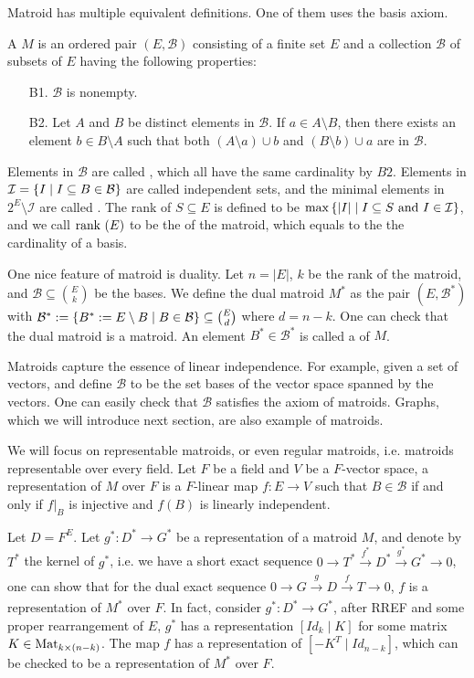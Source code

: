 \documentclass[b5paper]{article}
\newcommand{\II}{\mathcal{I}}
\newcommand{\BB}{\mathcal{B}}
\newcommand{\del}{\setminus}
\begin{document}
Matroid has multiple equivalent definitions. One of them uses the basis axiom. 
\begin{definition}[def:]{}
  A  $M$ is an ordered pair $(E,\BB)$ consisting of a finite set $E$ and a collection $\BB$ of subsets of $E$ having the following properties:
  \begin{enumerate}
    \item [B1.] $\BB$ is nonempty.
    \item [B2.] Let $A$ and $B$ be distinct elements in $\BB$. If $a\in A\del B$, then there exists an element $b\in B\del A$ such that both $(A\del a)\cup b$ and $(B\del b)\cup a$ are in $\BB$.
  \end{enumerate}
\end{definition}
Elements in $\BB$ are called , which all have the same cardinality by $B2$. Elements in $\II=\CB{I\mid I\subseteq B\in \BB}$ are called independent sets, and the minimal elements in $2^E\del \II$ are called . The rank of $S\subseteq E$ is defined to be $\max\CB{|I|\mid I\subseteq S\textnormal{ and }I\in \II}$, and we call $\textnormal{rank }(E)$ to be the  of the matroid, which equals to the the cardinality of a basis. 

One nice feature of matroid is duality. Let $n=|E|$, $k$ be the rank of the matroid, and $\BB\subseteq \binom{E}{k}$ be the bases. We define the dual matroid $M^*$ as the pair $(E,\BB^*)$ with $\BB^*:=\CB{B^*:=E\del B\mid B\in \BB}\subseteq \binom{E}{d}$ where $d=n-k$. One can check that the dual matroid is a matroid. An element $B^*\in \BB^*$ is called a  of $M$.

Matroids capture the essence of linear independence. For example, given a set of vectors, and define $\BB$ to be the set bases of the vector space spanned by the vectors. One can easily check that $\BB$ satisfies the axiom of matroids. Graphs, which we will introduce next section, are also example of matroids.

We will focus on representable matroids, or even regular matroids, i.e. matroids representable over every field.
Let $F$ be a field and $V$ be a $F$-vector space, a representation of $M$ over $F$ is a $F$-linear map $f:E\rightarrow V$ such that $B\in \BB$ if and only if $f|_B$ is injective and $f(B)$ is linearly independent.

Let $D=F^E$. Let $g^*:D^*\rightarrow G^*$ be a representation of a matroid $M$, and denote by $T^*$ the kernel of $g^*$, i.e. 
we have a short exact sequence $0\rightarrow T^*\xrightarrow[]{f^*}D^*\xrightarrow[]{g^*}G^*\rightarrow 0$, one can show that for the dual exact sequence $0\rightarrow G\xrightarrow[]{g} D\xrightarrow[]{f} T\rightarrow 0$, $f$ is a representation of $M^*$ over $F$.
In fact, consider $g^*:D^*\rightarrow G^*$, after RREF and some proper rearrangement of $E$, $g^*$ has a representation $[Id_k\mid K]$ for some matrix $K\in \textnormal{Mat}_{k\times (n-k)}$. The map $f$ has a representation of $[-K^T\mid Id_{n-k}]$, which can be checked to be a representation of $M^*$ over $F$.
\end{document}
